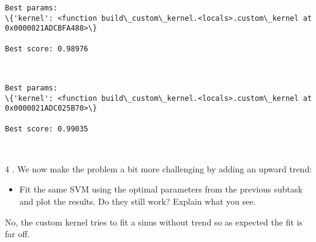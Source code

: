 \documentclass[11pt]{article}
\providecommand{\tightlist}{%
      \setlength{\itemsep}{0pt}\setlength{\parskip}{0pt}}
\begin{document}
    \begin{Verbatim}[commandchars=\\\{\}]
Best params:
\{'kernel': <function build\_custom\_kernel.<locals>.custom\_kernel at 0x0000021ADCBFA488>\}

Best score: 0.98976

    \end{Verbatim}

    \begin{center}
    \end{center}
    { \hspace*{\fill} \\}
    
    \begin{Verbatim}[commandchars=\\\{\}]
Best params:
\{'kernel': <function build\_custom\_kernel.<locals>.custom\_kernel at 0x0000021ADC025B70>\}

Best score: 0.99035

    \end{Verbatim}

    \begin{center}
    \end{center}
    { \hspace*{\fill} \\}
    
    4 . We now make the problem a bit more challenging by adding an upward
trend:

\begin{itemize}
\tightlist
\item
  Fit the same SVM using the optimal parameters from the previous
  subtask and plot the results. Do they still work? Explain what you
  see.
\end{itemize}

No, the custom kernel tries to fit a sinus without trend so as expected
the fit is far off.
\end{document}
